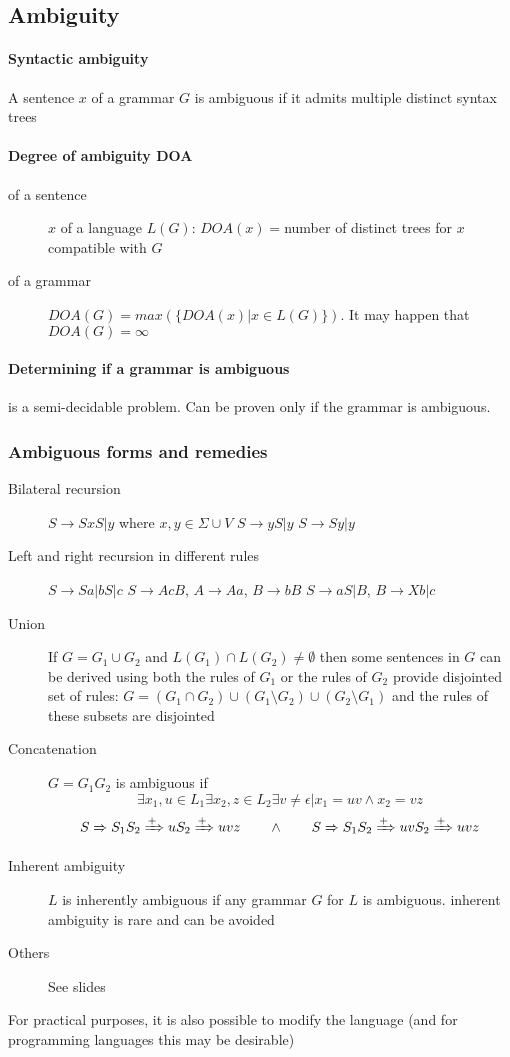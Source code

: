 \documentclass{article}
\newcommand{\derives}[1][ ]{\xRightarrow{#1}}
\begin{document}
\subsection{Ambiguity}
\paragraph{Syntactic ambiguity} A sentence $x$ of a grammar $G$ is ambiguous if it admits multiple distinct syntax trees
\paragraph{Degree of ambiguity DOA} 
\begin{description}
\item[of a sentence ] $x$ of a language $L(G)$: $DOA(x)=$number of distinct trees for $x$ compatible with $G$
\item[of a grammar] $DOA(G)=max(\{DOA(x)|x \in L(G)\})$. It may happen that $DOA(G)=\infty$
\end{description}
\paragraph{Determining if a grammar is ambiguous} is a semi-decidable problem. Can be proven only if the grammar is ambiguous.
\subsubsection{Ambiguous forms and remedies}
\begin{description}
\item[Bilateral recursion] $S \to S x S|y$ where $x,y \in \Sigma \cup V$
	 $S \to y S | y$
	 $S \to S y | y$
\item[Left and right recursion in different rules] $S \to Sa|bS|c$
	\subitem[Separate] $S\to AcB$,
					$A\to Aa$,
					$B\to bB$
	 $S\to aS|B$,
							$B\to Xb|c$
\item[Union] If $G=G_1 \cup G_2$ and $L(G_1) \cap L(G_2) \neq \emptyset$ then some sentences in $G$ can be derived using both the rules of $G_1$ or the rules of $G_2$
	\subitem[Disjoint] provide disjointed set of rules: $G=(G_1\cap G_2) \cup (G_1 \setminus G_2) \cup (G_2 \setminus G_1)$ and the rules of these subsets are disjointed
\item[Concatenation] $G=G_1G_2$ is ambiguous if 
\[
\exists x_1,u \in L_1
\exists x_2,z \in L_2
\exists v \neq \epsilon|
x_1=uv \wedge x_2=vz
\]
\[
S \derives S_1S_2 \derives[+] uS_2 \derives[+] uvz \qquad \wedge \qquad
S \derives S_1S_2 \derives[+] uvS_2 \derives[+] uvz
\]
\item[Inherent ambiguity] $L$ is inherently ambiguous if any grammar $G$ for $L$ is ambiguous.
	\subitem[Avoidance] inherent ambiguity is rare and can be avoided
\item[Others] See slides %
\end{description}
For practical purposes, it is also possible to modify the language (and for programming languages this may be desirable)
\end{document}
